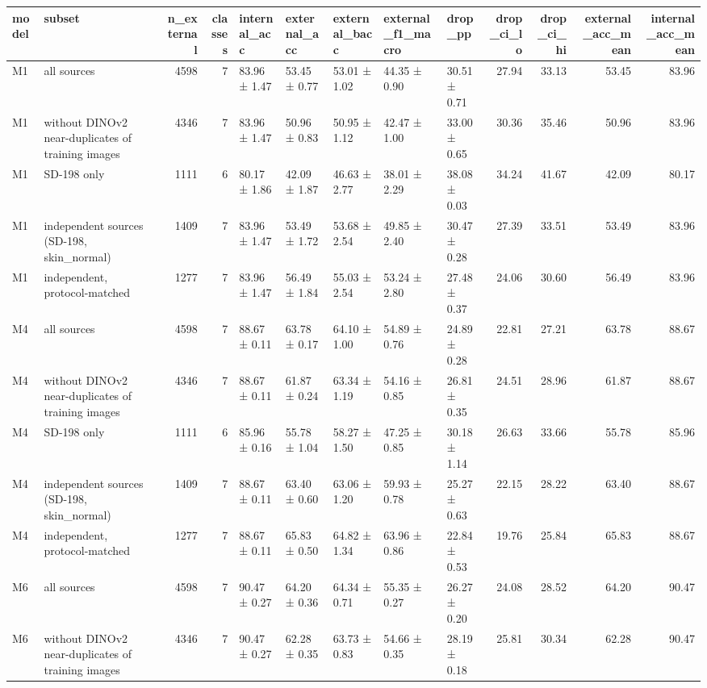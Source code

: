 \begin{tabular}{llrrlllllrrrr}
\toprule
model & subset & n\_external & classes & internal\_acc & external\_acc & external\_bacc & external\_f1\_macro & drop\_pp & drop\_ci\_lo & drop\_ci\_hi & external\_acc\_mean & internal\_acc\_mean \\
\midrule
M1 & all sources & 4598 & 7 & 83.96 ± 1.47 & 53.45 ± 0.77 & 53.01 ± 1.02 & 44.35 ± 0.90 & 30.51 ± 0.71 & 27.94 & 33.13 & 53.45 & 83.96 \\
M1 & without DINOv2 near-duplicates of training images & 4346 & 7 & 83.96 ± 1.47 & 50.96 ± 0.83 & 50.95 ± 1.12 & 42.47 ± 1.00 & 33.00 ± 0.65 & 30.36 & 35.46 & 50.96 & 83.96 \\
M1 & SD-198 only & 1111 & 6 & 80.17 ± 1.86 & 42.09 ± 1.87 & 46.63 ± 2.77 & 38.01 ± 2.29 & 38.08 ± 0.03 & 34.24 & 41.67 & 42.09 & 80.17 \\
M1 & independent sources (SD-198, skin\_normal) & 1409 & 7 & 83.96 ± 1.47 & 53.49 ± 1.72 & 53.68 ± 2.54 & 49.85 ± 2.40 & 30.47 ± 0.28 & 27.39 & 33.51 & 53.49 & 83.96 \\
M1 & independent, protocol-matched & 1277 & 7 & 83.96 ± 1.47 & 56.49 ± 1.84 & 55.03 ± 2.54 & 53.24 ± 2.80 & 27.48 ± 0.37 & 24.06 & 30.60 & 56.49 & 83.96 \\
M4 & all sources & 4598 & 7 & 88.67 ± 0.11 & 63.78 ± 0.17 & 64.10 ± 1.00 & 54.89 ± 0.76 & 24.89 ± 0.28 & 22.81 & 27.21 & 63.78 & 88.67 \\
M4 & without DINOv2 near-duplicates of training images & 4346 & 7 & 88.67 ± 0.11 & 61.87 ± 0.24 & 63.34 ± 1.19 & 54.16 ± 0.85 & 26.81 ± 0.35 & 24.51 & 28.96 & 61.87 & 88.67 \\
M4 & SD-198 only & 1111 & 6 & 85.96 ± 0.16 & 55.78 ± 1.04 & 58.27 ± 1.50 & 47.25 ± 0.85 & 30.18 ± 1.14 & 26.63 & 33.66 & 55.78 & 85.96 \\
M4 & independent sources (SD-198, skin\_normal) & 1409 & 7 & 88.67 ± 0.11 & 63.40 ± 0.60 & 63.06 ± 1.20 & 59.93 ± 0.78 & 25.27 ± 0.63 & 22.15 & 28.22 & 63.40 & 88.67 \\
M4 & independent, protocol-matched & 1277 & 7 & 88.67 ± 0.11 & 65.83 ± 0.50 & 64.82 ± 1.34 & 63.96 ± 0.86 & 22.84 ± 0.53 & 19.76 & 25.84 & 65.83 & 88.67 \\
M6 & all sources & 4598 & 7 & 90.47 ± 0.27 & 64.20 ± 0.36 & 64.34 ± 0.71 & 55.35 ± 0.27 & 26.27 ± 0.20 & 24.08 & 28.52 & 64.20 & 90.47 \\
M6 & without DINOv2 near-duplicates of training images & 4346 & 7 & 90.47 ± 0.27 & 62.28 ± 0.35 & 63.73 ± 0.83 & 54.66 ± 0.35 & 28.19 ± 0.18 & 25.81 & 30.34 & 62.28 & 90.47 \\

\end{tabular}
